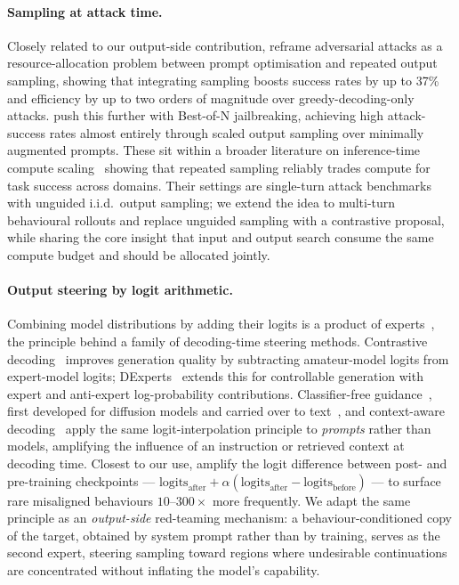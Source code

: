\documentclass{article}
\theoremstyle{plain}
\theoremstyle{definition}
\theoremstyle{remark}
\begin{document}
\paragraph{Sampling at attack time.}
Closely related to our output-side contribution, \citet{beyer2026sampling} reframe adversarial attacks as a resource-allocation problem between prompt optimisation and repeated output sampling, showing that integrating sampling boosts success rates by up to 37\% and efficiency by up to two orders of magnitude over greedy-decoding-only attacks.
\citet{hughes2024bon} push this further with Best-of-N jailbreaking, achieving high attack-success rates almost entirely through scaled output sampling over minimally augmented prompts.
These sit within a broader literature on inference-time compute scaling~\citep{brown2024monkeys,snell2024scaling} showing that repeated sampling reliably trades compute for task success across domains.
Their settings are single-turn attack benchmarks with unguided i.i.d.\ output sampling; we extend the idea to multi-turn behavioural rollouts and replace unguided sampling with a contrastive proposal, while sharing the core insight that input and output search consume the same compute budget and should be allocated jointly.


\paragraph{Output steering by logit arithmetic.}
Combining model distributions by adding their logits is a product of experts~\citep{hinton2002poe}, the principle behind a family of decoding-time steering methods.
Contrastive decoding~\citep{li2023contrastive} improves generation quality by subtracting amateur-model logits from expert-model logits; DExperts~\citep{liu2021dexperts} extends this for controllable generation with expert and anti-expert log-probability contributions.
Classifier-free guidance~\citep{ho2022cfg}, first developed for diffusion models and carried over to text~\citep{sanchez2023cfg}, and context-aware decoding~\citep{shi2024trusting} apply the same logit-interpolation principle to \emph{prompts} rather than models, amplifying the influence of an instruction or retrieved context at decoding time.
Closest to our use, \citet{aranguri2025diffamp} amplify the logit difference between post- and pre-training checkpoints --- $\text{logits}_{\text{after}} + \alpha(\text{logits}_{\text{after}} - \text{logits}_{\text{before}})$ --- to surface rare misaligned behaviours $10$--$300\times$ more frequently.
We adapt the same principle as an \emph{output-side} red-teaming mechanism: a behaviour-conditioned copy of the target, obtained by system prompt rather than by training, serves as the second expert, steering sampling toward regions where undesirable continuations are concentrated without inflating the model's capability.
\end{document}

